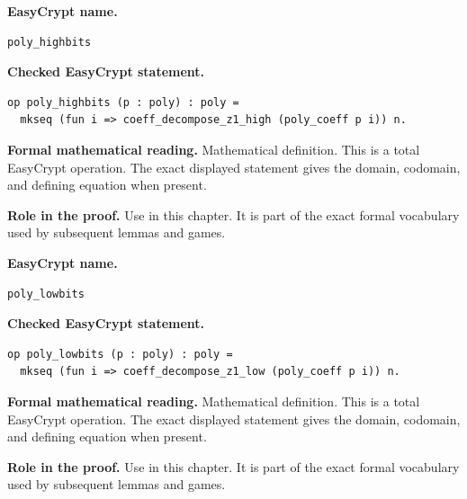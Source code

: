 \begin{formaldefinition}
\noindent\textbf{EasyCrypt name.}
\begin{lstlisting}[language=EasyCrypt,basicstyle=\ttfamily\scriptsize]
poly_highbits
\end{lstlisting}
\noindent\textbf{Checked EasyCrypt statement.}
\begin{lstlisting}[language=EasyCrypt,basicstyle=\ttfamily\scriptsize]
op poly_highbits (p : poly) : poly =
  mkseq (fun i => coeff_decompose_z1_high (poly_coeff p i)) n.
\end{lstlisting}
\noindent\textbf{Formal mathematical reading.}
Mathematical definition. This is a total EasyCrypt operation.  The exact displayed statement gives the domain, codomain, and defining equation when present.

\noindent\textbf{Role in the proof.}
Use in this chapter. It is part of the exact formal vocabulary used by subsequent lemmas and games.

\end{formaldefinition}

\begin{formaldefinition}
\noindent\textbf{EasyCrypt name.}
\begin{lstlisting}[language=EasyCrypt,basicstyle=\ttfamily\scriptsize]
poly_lowbits
\end{lstlisting}
\noindent\textbf{Checked EasyCrypt statement.}
\begin{lstlisting}[language=EasyCrypt,basicstyle=\ttfamily\scriptsize]
op poly_lowbits (p : poly) : poly =
  mkseq (fun i => coeff_decompose_z1_low (poly_coeff p i)) n.
\end{lstlisting}
\noindent\textbf{Formal mathematical reading.}
Mathematical definition. This is a total EasyCrypt operation.  The exact displayed statement gives the domain, codomain, and defining equation when present.

\noindent\textbf{Role in the proof.}
Use in this chapter. It is part of the exact formal vocabulary used by subsequent lemmas and games.

\end{formaldefinition}

